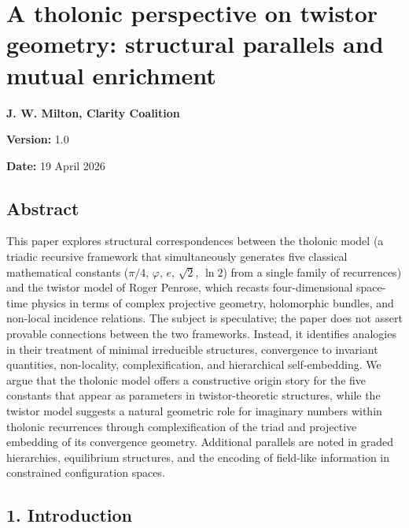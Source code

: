 \documentclass[
  11pt,
  letterpaper,
]{article}
\author{}
\date{}
\begin{document}
\section{A tholonic perspective on twistor geometry: structural
parallels and mutual
enrichment}\label{a-tholonic-perspective-on-twistor-geometry-structural-parallels-and-mutual-enrichment}

\textbf{J. W. Milton, Clarity Coalition}

\textbf{Version:} 1.0

\textbf{Date:} 19 April 2026

\subsection{Abstract}\label{abstract}

This paper explores structural correspondences between the tholonic
model (a triadic recursive framework that simultaneously generates five
classical mathematical constants (\(\pi/4\), \(\varphi\), \(e\),
\(\sqrt{2}\), \(\ln 2\)) from a single family of recurrences) and the
twistor model of Roger Penrose, which recasts four-dimensional
space-time physics in terms of complex projective geometry, holomorphic
bundles, and non-local incidence relations. The subject is speculative;
the paper does not assert provable connections between the two
frameworks. Instead, it identifies analogies in their treatment of
minimal irreducible structures, convergence to invariant quantities,
non-locality, complexification, and hierarchical self-embedding. We
argue that the tholonic model offers a constructive origin story for the
five constants that appear as parameters in twistor-theoretic
structures, while the twistor model suggests a natural geometric role
for imaginary numbers within tholonic recurrences through
complexification of the triad and projective embedding of its
convergence geometry. Additional parallels are noted in graded
hierarchies, equilibrium structures, and the encoding of field-like
information in constrained configuration spaces.

\subsection{1. Introduction}\label{introduction}
\end{document}
